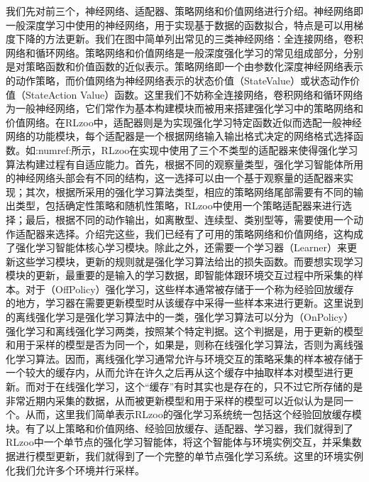 \documentclass[letterpaper,10pt,english]{sphinxmanual}
\begin{document}
\sphinxAtStartPar
我们先对前三个，神经网络、适配器、策略网络和价值网络进行介绍。神经网络即一般深度学习中使用的神经网络，用于实现基于数据的函数拟合，特点是可以用梯度下降的方法更新。我们在图中简单列出常见的三类神经网络：全连接网络，卷积网络和循环网络。策略网络和价值网络是一般深度强化学习的常见组成部分，分别是对策略函数和价值函数的近似表示。策略网络即一个由参数化深度神经网络表示的动作策略，而价值网络为神经网络表示的状态价值（State\sphinxhyphen{}Value）或状态\sphinxhyphen{}动作价值（State\sphinxhyphen{}Action
Value）函数。这里我们不妨称全连接网络，卷积网络和循环网络为一般神经网络，它们常作为基本构建模块而被用来搭建强化学习中的策略网络和价值网络。在RLzoo中，适配器则是为实现强化学习特定函数近似而选配一般神经网络的功能模块，每个适配器是一个根据网络输入输出格式决定的网络格式选择函数。如:numref:所示，RLzoo在实现中使用了三个不类型的适配器来使得强化学习算法构建过程有自适应能力。首先，根据不同的观察量类型，强化学习智能体所用的神经网络头部会有不同的结构，这一选择可以由一个基于观察量的适配器来实现；其次，根据所采用的强化学习算法类型，相应的策略网络尾部需要有不同的输出类型，包括确定性策略和随机性策略，RLzoo中使用一个策略适配器来进行选择；最后，根据不同的动作输出，如离散型、连续型、类别型等，需要使用一个动作适配器来选择。介绍完这些，我们已经有了可用的策略网络和价值网络，这构成了强化学习智能体核心学习模块。除此之外，还需要一个学习器（Learner）来更新这些学习模块，更新的规则就是强化学习算法给出的损失函数。而要想实现学习模块的更新，最重要的是输入的学习数据，即智能体跟环境交互过程中所采集的样本。对于（Off\sphinxhyphen{}Policy）强化学习，这些样本通常被存储于一个称为经验回放缓存的地方，学习器在需要更新模型时从该缓存中采得一些样本来进行更新。这里说到的离线强化学习是强化学习算法中的一类，强化学习算法可以分为（On\sphinxhyphen{}Policy）强化学习和离线强化学习两类，按照某个特定判据。这个判据是，用于更新的模型和用于采样的模型是否为同一个，如果是，则称在线强化学习算法，否则为离线强化学习算法。因而，离线强化学习通常允许与环境交互的策略采集的样本被存储于一个较大的缓存内，从而允许在许久之后再从这个缓存中抽取样本对模型进行更新。而对于在线强化学习，这个“缓存”有时其实也是存在的，只不过它所存储的是非常近期内采集的数据，从而被更新模型和用于采样的模型可以近似认为是同一个。从而，这里我们简单表示RLzoo的强化学习系统统一包括这个经验回放缓存模块。有了以上策略和价值网络、经验回放缓存、适配器、学习器，我们就得到了RLzoo中一个单节点的强化学习智能体，将这个智能体与环境实例交互，并采集数据进行模型更新，我们就得到了一个完整的单节点强化学习系统。这里的环境实例化我们允许多个环境并行采样。
\end{document}
